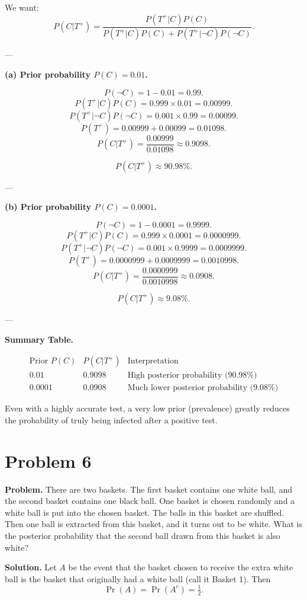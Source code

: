 \documentclass{article}
\begin{document}
We want:
\[
P(C|T^+) = \frac{P(T^+|C)P(C)}{P(T^+|C)P(C) + P(T^+|\neg C)P(\neg C)}.
\]

---

\textbf{(a) Prior probability \( P(C) = 0.01 \).}

\[
P(\neg C) = 1 - 0.01 = 0.99.
\]
\[
P(T^+|C)P(C) = 0.999 \times 0.01 = 0.00999.
\]
\[
P(T^+|\neg C)P(\neg C) = 0.001 \times 0.99 = 0.00099.
\]
\[
P(T^+) = 0.00999 + 0.00099 = 0.01098.
\]
\[
P(C|T^+) = \frac{0.00999}{0.01098} \approx 0.9098.
\]

\[
\boxed{P(C|T^+) \approx 90.98\%}.
\]

---

\textbf{(b) Prior probability \( P(C) = 0.0001 \).}

\[
P(\neg C) = 1 - 0.0001 = 0.9999.
\]
\[
P(T^+|C)P(C) = 0.999 \times 0.0001 = 0.0000999.
\]
\[
P(T^+|\neg C)P(\neg C) = 0.001 \times 0.9999 = 0.0009999.
\]
\[
P(T^+) = 0.0000999 + 0.0009999 = 0.0010998.
\]
\[
P(C|T^+) = \frac{0.0000999}{0.0010998} \approx 0.0908.
\]

\[
\boxed{P(C|T^+) \approx 9.08\%}.
\]

---

\textbf{Summary Table.}

\[
\begin{array}{c|c|c}
\text{Prior } P(C) & P(C|T^+) & \text{Interpretation} \\ \hline
0.01 & 0.9098 & \text{High posterior probability (90.98\%)} \\
0.0001 & 0.0908 & \text{Much lower posterior probability (9.08\%)} 
\end{array}
\]

Even with a highly accurate test, a very low prior (prevalence) greatly reduces the probability of truly being infected after a positive test.

\section{Problem 6}

\textbf{Problem.} There are two baskets. The first basket contains one white ball, and the second basket contains one black ball. One basket is chosen randomly and a white ball is put into the chosen basket. The balls in this basket are shuffled. Then one ball is extracted from this basket, and it turns out to be white. What is the posterior probability that the second ball drawn from this basket is also white?

\textbf{Solution.}
Let $A$ be the event that the basket chosen to receive the extra white ball is the basket that originally had a white ball (call it Basket 1). Then
\[
\Pr(A)=\Pr(A^c)=\tfrac12.
\]
\end{document}
